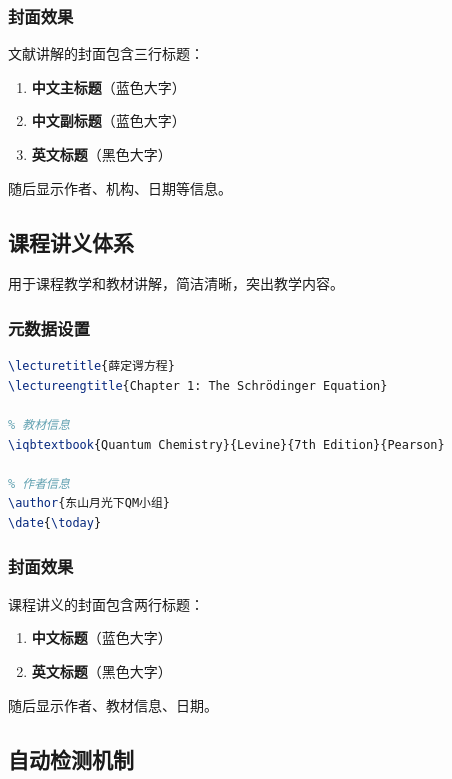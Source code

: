 \subsubsection{封面效果}

文献讲解的封面包含三行标题：
\begin{enumerate}
  \item \textbf{中文主标题}（蓝色大字）
  \item \textbf{中文副标题}（蓝色大字）
  \item \textbf{英文标题}（黑色大字）
\end{enumerate}

随后显示作者、机构、日期等信息。

\subsection{课程讲义体系}

用于课程教学和教材讲解，简洁清晰，突出教学内容。

\subsubsection{元数据设置}

\begin{lstlisting}[style=blockstyle,language=TeX]
% 课程讲义元数据
\lecturetitle{薛定谔方程}
\lectureengtitle{Chapter 1: The Schrödinger Equation}

% 教材信息
\iqbtextbook{Quantum Chemistry}{Levine}{7th Edition}{Pearson}

% 作者信息
\author{东山月光下QM小组}
\date{\today}
\end{lstlisting}

\subsubsection{封面效果}

课程讲义的封面包含两行标题：
\begin{enumerate}
  \item \textbf{中文标题}（蓝色大字）
  \item \textbf{英文标题}（黑色大字）
\end{enumerate}

随后显示作者、教材信息、日期。

\subsection{自动检测机制}

